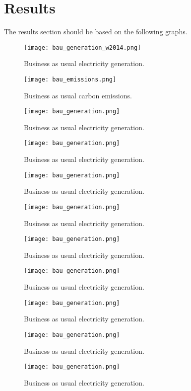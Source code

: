 \section{Results}

The results section should be based on the following graphs.

\begin{figure}
	\texttt{[image: bau\_generation\_w2014.png]}
	\caption{Business as usual electricity generation.}
	\label{fig:bau_generation}
\end{figure}
\begin{figure}
	\texttt{[image: bau\_emissions.png]}
	\caption{Business as usual carbon emissions.}
	\label{fig:bau_emissions}
\end{figure}
\begin{figure}
	\texttt{[image: bau\_generation.png]}
	\caption{Business as usual electricity generation.}
	\label{fig:}
\end{figure}
\begin{figure}
	\texttt{[image: bau\_generation.png]}
	\caption{Business as usual electricity generation.}
	\label{fig:}
\end{figure}
\begin{figure}
	\texttt{[image: bau\_generation.png]}
	\caption{Business as usual electricity generation.}
	\label{fig:}
\end{figure}
\begin{figure}
	\texttt{[image: bau\_generation.png]}
	\caption{Business as usual electricity generation.}
	\label{fig:}
\end{figure}
\begin{figure}
	\texttt{[image: bau\_generation.png]}
	\caption{Business as usual electricity generation.}
	\label{fig:}
\end{figure}
\begin{figure}
	\texttt{[image: bau\_generation.png]}
	\caption{Business as usual electricity generation.}
	\label{fig:}
\end{figure}
\begin{figure}
	\texttt{[image: bau\_generation.png]}
	\caption{Business as usual electricity generation.}
	\label{fig:}
\end{figure}
\begin{figure}
	\texttt{[image: bau\_generation.png]}
	\caption{Business as usual electricity generation.}
	\label{fig:}
\end{figure}
\begin{figure}
	\texttt{[image: bau\_generation.png]}
	\caption{Business as usual electricity generation.}
	\label{fig:}
\end{figure}

